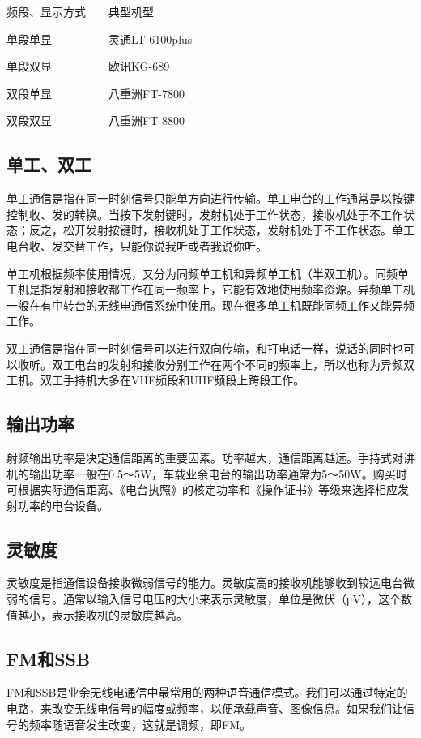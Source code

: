 \documentclass[12pt,UTF8]{ctexbook}
\begin{document}
频段、显示方式　　典型机型

单段单显　　　　　灵通LT-6100plus

单段双显　　　　　欧讯KG-689

双段单显　　　　　八重洲FT-7800

双段双显　　　　　八重洲FT-8800

\subsection{单工、双工}

单工通信是指在同一时刻信号只能单方向进行传输。单工电台的工作通常是以按键控制收、发的转换。当按下发射键时，发射机处于工作状态，接收机处于不工作状态；反之，松开发射按键时，接收机处于工作状态，发射机处于不工作状态。单工电台收、发交替工作，只能你说我听或者我说你听。

单工机根据频率使用情况，又分为同频单工机和异频单工机（半双工机）。同频单工机是指发射和接收都工作在同一频率上，它能有效地使用频率资源。异频单工机一般在有中转台的无线电通信系统中使用。现在很多单工机既能同频工作又能异频工作。

双工通信是指在同一时刻信号可以进行双向传输，和打电话一样，说话的同时也可以收听。双工电台的发射和接收分别工作在两个不同的频率上，所以也称为异频双工机。双工手持机大多在VHF频段和UHF频段上跨段工作。

\subsection{输出功率}

射频输出功率是决定通信距离的重要因素。功率越大，通信距离越远。手持式对讲机的输出功率一般在0.5～5W，车载业余电台的输出功率通常为5～50W。购买时可根据实际通信距离、《电台执照》的核定功率和《操作证书》等级来选择相应发射功率的电台设备。

\subsection{灵敏度}

灵敏度是指通信设备接收微弱信号的能力。灵敏度高的接收机能够收到较远电台微弱的信号。通常以输入信号电压的大小来表示灵敏度，单位是微伏（μV），这个数值越小，表示接收机的灵敏度越高。

\subsection{FM和SSB}

FM和SSB是业余无线电通信中最常用的两种语音通信模式。我们可以通过特定的电路，来改变无线电信号的幅度或频率，以便承载声音、图像信息。如果我们让信号的频率随语音发生改变，这就是调频，即FM。
\end{document}
